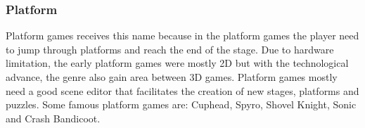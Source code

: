 \subsubsection{Platform}
Platform games receives this name because in the platform games the player need to jump through platforms and reach the end of the stage. Due to hardware limitation, the early platform games were mostly 2D but with the technological advance, the genre also gain area between 3D games\cite{AIGameEngineProgramming}. Platform games mostly need a good scene editor that facilitates the creation of new stages, platforms and puzzles\cite{GameEngineArchitecture}. Some famous platform games are: Cuphead, Spyro, Shovel Knight, Sonic and Crash Bandicoot\cite{PlatformGames}.